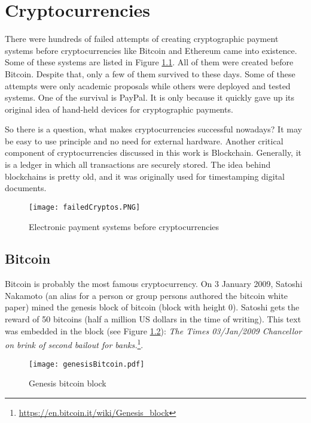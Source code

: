 \chapter{Cryptocurrencies}
\label{Cryptocurrencies}

There were hundreds of failed attempts of creating cryptographic payment systems before cryptocurrencies like Bitcoin and Ethereum came into existence. Some of these systems are listed in Figure \ref{paymentSystems}. All of them were created before Bitcoin. Despite that, only a few of them survived to these days. Some of these attempts were only academic proposals while others were deployed and tested systems. One of the survival is PayPal. It is only because it quickly gave up its original idea of hand-held devices for cryptographic payments.\cite{wayner1997digital}

So there is a question, what makes cryptocurrencies successful nowadays?  It may be easy to use principle and no need for external hardware. 
Another critical component of cryptocurrencies discussed in this work is Blockchain. Generally, it is a ledger in which all transactions are securely stored. The idea behind blockchains is pretty old, and it was originally used for timestamping digital documents.\cite{haber1990time} 


\begin{figure}[h]
    \centering
    \texttt{[image: failedCryptos.PNG]}
    \caption{Electronic payment systems before cryptocurrencies\cite{narayanan2016bitcoin}}
    \label{paymentSystems}
\end{figure}


\section{Bitcoin}
Bitcoin is probably the most famous cryptocurrency. On 3 January 2009, Satoshi Nakamoto (an alias for a person or group persons authored the bitcoin white paper) mined the genesis block of bitcoin (block with height 0). Satoshi gets the reward of 50 bitcoins (half a million US dollars in the time of writing). This text was embedded in the block (see Figure \ref{genesisBitcoin}): \textit{The Times 03/Jan/2009 Chancellor on brink of second bailout for banks.}\footnote{\url{https://en.bitcoin.it/wiki/Genesis\_block}}\cite{newYorkerBTC}. 

\begin{figure}[h]
    \centering
    \texttt{[image: genesisBitcoin.pdf]}
    \caption{Genesis bitcoin block}
    \label{genesisBitcoin}
\end{figure}

